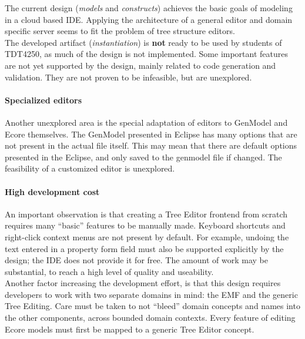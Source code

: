
The current design (\textit{models} and \textit{constructs}) achieves the basic goals of modeling in a \gls{cloud} based \acrshort{IDE}.
Applying the architecture of a general editor and domain specific server seems to fit the problem of tree structure editors.\\

The developed artifact (\textit{instantiation}) is \textbf{not} ready to be used by students of \gls{TDT4250}, as much of the design is not implemented.
Some important features are not yet supported by the design, mainly related to code generation and validation.
They are not proven to be infeasible, but are unexplored. \\

\paragraph{Specialized editors}
Another unexplored area is the special adaptation of editors to GenModel and Ecore themselves.
The GenModel presented in \gls{Eclipse} has many options that are not present in the actual file itself.
This may mean that there are default options presented in the \gls{Eclipse}, and only saved to the genmodel file if changed.
The feasibility of a customized editor is unexplored. \\

\paragraph{High development cost}
An important observation is that creating a Tree Editor frontend from scratch requires many ``basic'' features to be manually made.
Keyboard shortcuts and right-click context menus are not present by default.
For example, undoing the text entered in a property form field must also be supported explicitly by the design; the \acrshort{IDE} does not provide it for free.
The amount of work may be substantial, to reach a high level of quality and useability.\\

Another factor increasing the development effort, is that this design requires developers to work with two separate domains in mind: the \acrshort{EMF} and the generic Tree Editing.
Care must be taken to not ``bleed'' domain concepts and names into the other components, across bounded domain contexts.
Every feature of editing \gls{Ecore} models must first be mapped to a generic Tree Editor concept.

